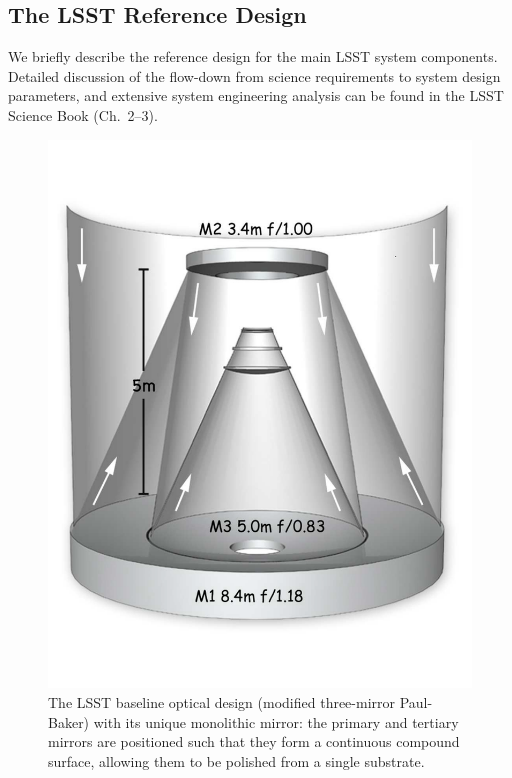 \documentclass{emulateapj}
\begin{document}
\subsection{     The LSST  Reference Design    }

We briefly describe the reference design for the main LSST system components. 
Detailed discussion of the flow-down from science requirements to system 
design parameters, and extensive system engineering analysis can be 
found in the LSST Science Book (Ch.~2--3). 

\begin{figure}
\vskip -0.5in
\includegraphics[width=1.0\hsize,clip]{mirrors.pdf}
\vskip -0.5in
\caption{The LSST baseline optical design (modified three-mirror
  Paul-Baker) with its unique 
monolithic mirror: the primary and tertiary mirrors are positioned such 
that they form a continuous compound surface, allowing them to be polished 
from a single substrate.}
\label{Fig:optics}
\end{figure}
\end{document}

